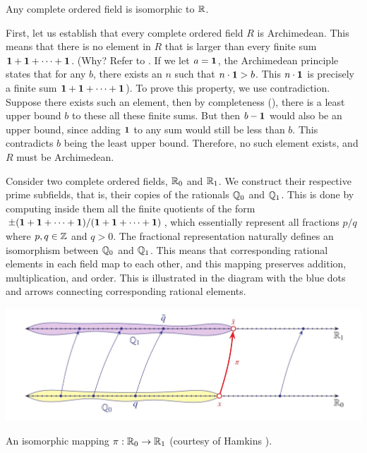 \documentclass[11pt,twoside=off,numbers=noenddot]{scrbook}
\begin{document}
\begin{theorem}[Uniqueness of $\RR$]
  Any complete ordered field is isomorphic to $\RR$.
\end{theorem}

\begin{proofsketch}
  First, let us establish that every complete ordered field $R$ is
  Archimedean. This means that there is no element in $R$ that is
  larger than every finite sum $\textbf{1} + \textbf{1} + \dots + \textbf{1}$. (Why?
    Refer to . If we let $a = \textbf{1}$, the
    Archimedean principle states that for any $b$, there exists an $n$
    such that $n \cdot \textbf{1} > b$. This $n \cdot \textbf{1}$ is precisely a
  finite sum $\textbf{1} + \textbf{1} + \dots + \textbf{1}$). To prove this property,
  we use contradiction. Suppose there exists such an element, then by
  completeness (), there is a least upper bound
  $b$ to these all these finite sums. But then $b - \textbf{1}$ would also
  be an upper bound, since adding $\textbf{1}$ to any sum would still be
  less than $b$. This contradicts $b$ being the least upper bound.
  Therefore, no such element exists, and $R$ must be Archimedean.

  Consider two complete ordered fields, $\mathbb R_0$ and $\mathbb R_1$. We
  construct their respective prime subfields, that is, their copies
  of the rationals $\mathbb Q_0$ and $\mathbb Q_1$. This is done by computing
  inside them all the finite quotients of the form $\pm(\textbf{1} + \textbf{1} +
  \dots + \textbf{1})/(\textbf{1} + \textbf{1} + \dots + \textbf{1})$, which essentially
  represent all fractions $p/q$ where $p, q \in \mathbb Z$ and $q > 0$. The
  fractional representation naturally defines an isomorphism between
  $\mathbb Q_0$ and $\mathbb Q_1$. This means that corresponding rational
  elements in each field map to each other, and this mapping
  preserves addition, multiplication, and order. This is illustrated
  in the diagram with the blue dots and arrows connecting
  corresponding rational elements.

  \begin{tightfigure}
    \centering
    \includegraphics[width=\textwidth]{media/uniqueness-of-the-reals.jpg}
    \vspace{-24pt}
    \caption{An isomorphic mapping $\pi : \mathbb R_0 \to \mathbb R_1$ (courtesy
    of Hamkins \cite{img:uniqueness-of-r}).}
  \end{tightfigure}


\end{proofsketch}
\end{document}
